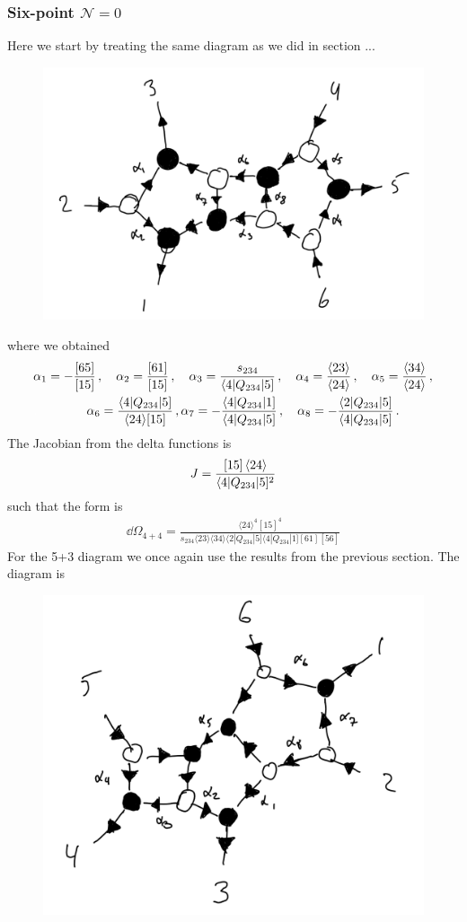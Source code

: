 \documentclass[letter,11pt]{article}
\newcommand{\ab}[1]{\langle #1 \rangle}
\newcommand{\sqb}[1]{[ #1 ]}
\newcommand{\aMs}[3]{\langle #1|#2|#3]}  		%
\newcommand{\sab}[1]{s_{#1}}
\newcommand{\twhite}[1]{\textcolor{white}{#1}}
\begin{document}
\subsubsection{Six-point $\mathcal{N}=0$}
Here we start by treating the same diagram as we did in section ...
\begin{figure}[H]
	\centering
	\includegraphics[width=0.5\linewidth]{6ptYM}
	\caption{}
	\label{fig:5pt}
\end{figure}
where we obtained
\begin{align*}
	& \alpha_1 = -\frac{[65]}{[15]}\,, \quad \alpha_2 = \frac{[61]}{[15]}\,, \quad \alpha_3 = \frac{\sab{234}}{\aMs{4}{Q_{234}}{5}}\,, \quad \alpha_4 = \frac{\ab{23}}{\ab{24}}\,, \quad
	\alpha_5 = \frac{\ab{34}}{\ab{24}}\,, \\ 
	& \twhite{.}\hspace{1.4cm} 
	\alpha_6 = \frac{\aMs{4}{Q_{234}}{5}}{\ab{24}\sqb{15}}\,, \alpha_7 = -\frac{\aMs{4}{Q_{234}}{1}}{\aMs{4}{Q_{234}}{5}}\,,\quad
	\alpha_8 = - \frac{\aMs{2}{Q_{234}}{5}}{\aMs{4}{Q_{234}}{5}}\,.
\end{align*}
The Jacobian from the delta functions is
\begin{equation}
	\begin{aligned}
		J=\frac{[15]\expval{24}}{\aMs{4}{Q_{234}}{5}^2}
	\end{aligned}
\end{equation}
such that the form is
\begin{equation}
	\begin{aligned}
		\dd\Omega_{4+4}=\frac{\ab{24}^4 \sqb{15}^4}{s_{234}\ab{23}\ab{34}\aMs{2}{Q_{234}}{5}\aMs{4}{Q_{234}}{1}\sqb{61}\sqb{56}}
	\end{aligned}
\end{equation}
For the 5+3 diagram we once again use the results from the previous section. The diagram is
\begin{figure}[H]
	\centering
	\includegraphics[width=0.4\linewidth]{5ptYM}
	\caption{}
	\label{fig:5pt}
\end{figure}
\end{document}
